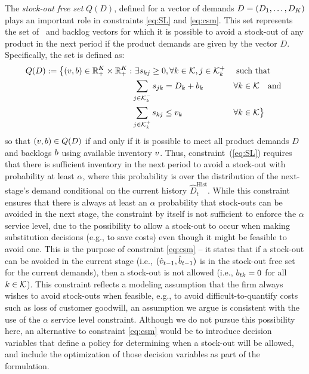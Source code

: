 \documentclass[msom]{oo}
\begin{document}
The {\it stock-out free set} $Q(D)$, defined for a vector of demands $D=(D_1,\ldots,D_{K})$ plays an important role in constraints \eqref{eq:SL} and  \eqref{eq:csm}. This set represents the set of \InvPos\  and backlog vectors for which it is possible to avoid a stock-out of any product in the next period if the product demands are given by the vector $D$. Specifically, the set is defined as:
\begin{alignat}{2} Q(D) := \bigl\{ (\Vi,\Bi) \in \mathbb{R}_{+}^{\Ka} \times \mathbb{R}_+^{\Ka} :  & \ \exists \Es_{\ka \jey} \geq 0, \forall \ka \in \KA, \jey \in \Csub && \text{ such that } \notag \\
& \sum_{j \in \Psub} \Es_{\jey \ka } = D_{\ka} + \Bi_{\ka} \ && \forall \ka  \in \KA  \quad \text{and }\notag \\
 & \sum_{\jey \in  \Csub} \Es_{\ka \jey} \leq \Vi_{\ka} \ && \forall \ka  \in \KA \bigr\}  \label{eq:SetQ}
 \end{alignat}
 so that $(v,b) \in Q(D)$ if and only if it is possible to meet all product demands $D$ and backlogs  $b$ using available inventory $v$.
Thus, constraint~(\ref{eq:SL}) requires that there is sufficient inventory in the next period to avoid a stock-out with probability at least $\alpha$, where this probability is over the distribution of the next-stage's demand conditional on the current history $\hat{D}_t^{\text{Hist}}$. While this constraint ensures that there is always at least an $\alpha$ probability that stock-outs can be avoided in the next stage, the constraint by itself is not sufficient to enforce the $\alpha$ service level, due to the possibility to allow a stock-out to occur when making substitution decisions (e.g., to save costs) even though it might be feasible to avoid one. This is the purpose of constraint \eqref{eq:csm} -- it states that if a stock-out can be avoided in the current stage (i.e., $(\hat{v}_{t-1},\hat{b}_{t-1})$ is in the stock-out free set for the current demands), then a stock-out is not allowed (i.e., $b_{t k} = 0$ for all $k \in \mathcal{K}$). This constraint reflects a modeling assumption that the firm always wishes to avoid stock-outs when feasible, e.g., to avoid difficult-to-quantify costs such as loss of customer goodwill, an assumption we argue is consistent with the use of the $\alpha$ service level constraint. Although we do not pursue this possibility here, an alternative to constraint \eqref{eq:csm} would be to introduce decision variables that define a policy for determining when a stock-out will be allowed, and include the optimization of those decision variables as part of the formulation.
\end{document}
